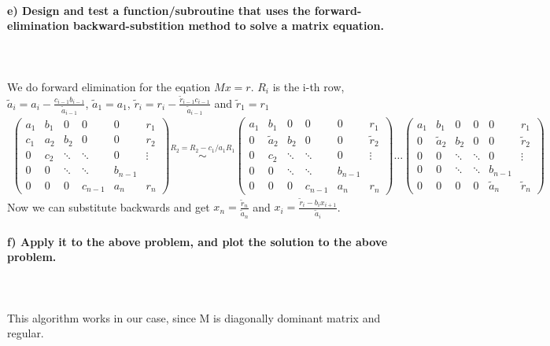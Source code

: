 \newpage
\paragraph{
    e) Design and test a function/subroutine that uses the
    forward-elimination backward-substition method to solve a matrix
    equation.
} \ \\
    \\
    We do forward elimination for the eqation $Mx = r$. $R_i$ is the i-th row, $\tilde{a}_i = a_i - \frac{c_{i-1} b_{i-1}}{\tilde{a}_{i-1}}$, $\tilde{a}_1 = a_1$, $\tilde{r}_i = r_i - \frac{\tilde{r}_{i-1} c_{i-1}}{\tilde{a}_{i-1}}$ and $\tilde{r}_1 = r_1$
    \begin{align}
	\begin{pmatrix}
	a_1 & b_1 & 0      & 0       & 0   & r_1\\
	c_1 & a_2 & b_2    & 0       & 0 & r_2\\
	0   & c_2 & \ddots & \ddots  & 0 & \vdots\\
	0   & 0   & \ddots & \ddots  & b_{n-1} &\\
	0   & 0   & 0      & c_{n-1} & a_n& r_n
	\end{pmatrix}
	\overset{R_2 = R_2 - c_1/a_1 R_1}{\sim}
	\begin{pmatrix}
	a_1 & b_1 & 0      & 0       & 0   & r_1\\
	0 & \tilde{a}_2 & b_2    & 0       & 0 & \tilde{r}_2\\
	0   & c_2 & \ddots & \ddots  & 0 & \vdots\\
	0   & 0   & \ddots & \ddots  & b_{n-1} &\\
	0   & 0   & 0      & c_{n-1} & a_n& r_n
	\end{pmatrix}
	\dots
	\begin{pmatrix}
	a_1 & b_1 & 0      & 0       & 0   & r_1\\
	0 & \tilde{a}_2 & b_2    & 0       & 0 & \tilde{r}_2\\
	0   & 0 & \ddots & \ddots  & 0 & \vdots\\
	0   & 0   & \ddots & \ddots  & b_{n-1} &\\
	0   & 0   & 0      & 0 & \tilde{a}_n& \tilde{r}_n
	\end{pmatrix}
    \end{align}
    Now we can substitute backwards and get $x_n = \frac{\tilde{r}_n}{\tilde{a}_n} $ and $x_i = \frac{\tilde{r}_{i} - b_{i} x_{i+1}}{\tilde{a}_{i}}$.


\paragraph{
    f) Apply it to the above problem, and plot the solution to the
    above problem.
} \ \\
    \\
	This algorithm works in our case, since M is diagonally dominant matrix and regular.

